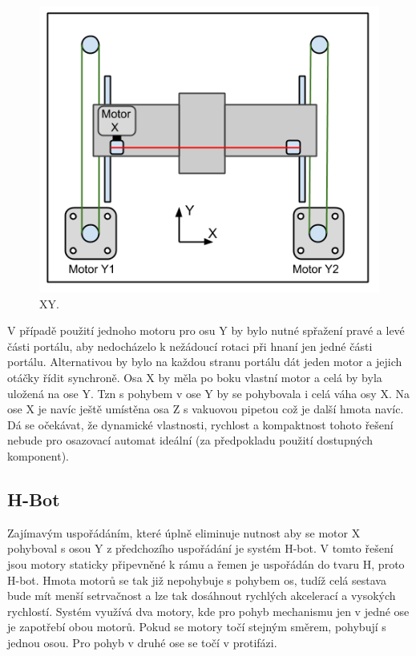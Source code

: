 \begin{figure}[h!]
  \centering
    \includegraphics[width=0.6\linewidth]{obrazky/XY.png}%
    \caption{XY.}
    \label{fig:XY}
\end{figure}


V případě použití jednoho motoru pro osu Y by bylo nutné spřažení pravé a levé části portálu, aby nedocházelo k nežádoucí rotaci při hnaní jen jedné části portálu. Alternativou by bylo na každou stranu portálu dát jeden motor a jejich otáčky řídit synchroně. 
Osa X by měla po boku vlastní motor a celá by byla uložená na ose Y. Tzn s pohybem v ose Y by se pohybovala i celá váha osy X. Na ose X je navíc ještě umístěna osa Z s vakuovou pipetou což je další hmota navíc. Dá se očekávat, že dynamické vlastnosti, rychlost a kompaktnost tohoto řešení nebude pro osazovací automat ideální (za předpokladu použití dostupných komponent).





\subsection{H-Bot}
Zajímavým uspořádáním, které úplně eliminuje nutnost aby se motor X pohyboval s osou Y z předchozího uspořádání je systém H-bot. V tomto řešení jsou motory staticky připevněné k rámu a řemen je uspořádán do tvaru H, proto H-bot. Hmota motorů se tak již nepohybuje s pohybem os, tudíž celá sestava bude mít menší setrvačnost a lze tak dosáhnout rychlých akcelerací a vysokých rychlostí. Systém využívá dva motory, kde pro pohyb mechanismu jen v jedné ose je zapotřebí obou motorů. Pokud se motory točí stejným směrem, pohybují s jednou osou. Pro pohyb v druhé ose se točí v protifázi.



